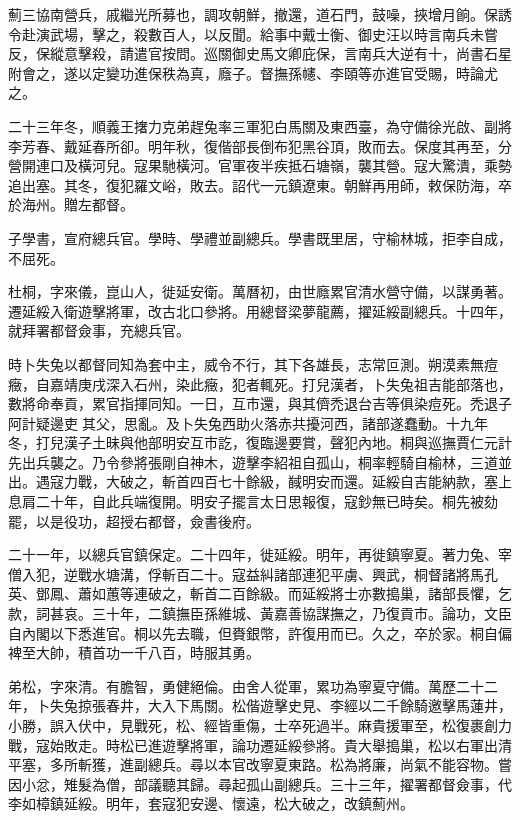 \begin{pinyinscope}
薊三協南營兵，戚繼光所募也，調攻朝鮮，撤還，道石門，鼓噪，挾增月餉。保誘令赴演武場，擊之，殺數百人，以反聞。給事中戴士衡、御史汪以時言南兵未嘗反，保縱意擊殺，請遣官按問。巡關御史馬文卿庇保，言南兵大逆有十，尚書石星附會之，遂以定變功進保秩為真，廕子。督撫孫幰、李頤等亦進官受賜，時論尤之。

二十三年冬，順義王撦力克弟趕兔率三軍犯白馬關及東西臺，為守備徐光啟、副將李芳春、戴延春所卻。明年秋，復偕部長倒布犯黑谷頂，敗而去。保度其再至，分營開連口及橫河兒。寇果馳橫河。官軍夜半疾抵石塘嶺，襲其營。寇大驚潰，乘勢追出塞。其冬，復犯羅文峪，敗去。詔代一元鎮遼東。朝鮮再用師，敕保防海，卒於海州。贈左都督。

子學書，宣府總兵官。學時、學禮並副總兵。學書既里居，守榆林城，拒李自成，不屈死。

杜桐，字來儀，崑山人，徙延安衛。萬曆初，由世廕累官清水營守備，以謀勇著。遷延綏入衛遊擊將軍，改古北口參將。用總督梁夢龍薦，擢延綏副總兵。十四年，就拜署都督僉事，充總兵官。

時卜失兔以都督同知為套中主，威令不行，其下各雄長，志常叵測。朔漠素無痘癥，自嘉靖庚戌深入石州，染此癥，犯者輒死。打兒漢者，卜失兔祖吉能部落也，數將命奉貢，累官指揮同知。一日，互市還，與其儕禿退台吉等俱染痘死。禿退子阿計疑邊吏其父，思亂。及卜失兔西助火落赤共擾河西，諸部遂蠢動。十九年冬，打兒漢子土昧與他部明安互市訖，復臨邊要賞，聲犯內地。桐與巡撫賈仁元計先出兵襲之。乃令參將張剛自神木，遊擊李紹祖自孤山，桐率輕騎自榆林，三道並出。遇寇力戰，大破之，斬首四百七十餘級，馘明安而還。延綏自吉能納款，塞上息肩二十年，自此兵端復開。明安子擺言太日思報復，寇鈔無已時矣。桐先被劾罷，以是役功，超授右都督，僉書後府。

二十一年，以總兵官鎮保定。二十四年，徙延綏。明年，再徙鎮寧夏。著力兔、宰僧入犯，逆戰水塘溝，俘斬百二十。寇益糾諸部連犯平虜、興武，桐督諸將馬孔英、鄧鳳、蕭如蕙等連破之，斬首二百餘級。而延綏將士亦數搗巢，諸部長懼，乞款，詞甚哀。三十年，二鎮撫臣孫維城、黃嘉善協謀撫之，乃復貢市。論功，文臣自內閣以下悉進官。桐以先去職，但賚銀幣，許復用而已。久之，卒於家。桐自偏裨至大帥，積首功一千八百，時服其勇。

弟松，字來清。有膽智，勇健絕倫。由舍人從軍，累功為寧夏守備。萬歷二十二年，卜失兔掠張春井，大入下馬關。松偕遊擊史見、李經以二千餘騎邀擊馬蓮井，小勝，誤入伏中，見戰死，松、經皆重傷，士卒死過半。麻貴援軍至，松復裹創力戰，寇始敗走。時松已進遊擊將軍，論功遷延綏參將。貴大舉搗巢，松以右軍出清平塞，多所斬獲，進副總兵。尋以本官改寧夏東路。松為將廉，尚氣不能容物。嘗因小忿，雉髮為僧，部議聽其歸。尋起孤山副總兵。三十三年，擢署都督僉事，代李如樟鎮延綏。明年，套寇犯安邊、懷遠，松大破之，改鎮薊州。


\end{pinyinscope}
